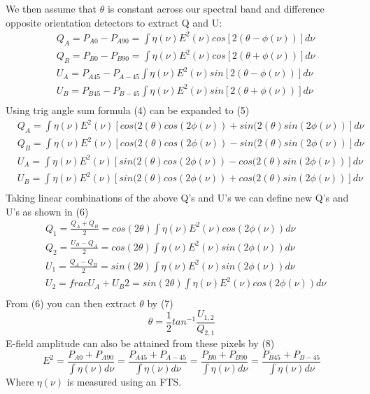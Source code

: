 We then assume that $\theta$ is constant across our spectral band and difference opposite orientation detectors to extract Q and U:
\begin{equation}
\begin{split}
&Q_A= P_{A0}-P_{A90}=\int \eta(\nu)E^2(\nu)cos[2(\theta-\phi(\nu))]d\nu \\
&Q_B = P_{B0}-P_{B90}=\int \eta(\nu)E^2(\nu)cos[2(\theta+\phi(\nu))] d\nu \\
&U_A = P_{A45}-P_{A-45}\int \eta(\nu)E^2(\nu)sin[2(\theta-\phi(\nu))] d\nu \\
&U_B =  P_{B45}-P_{B-45}\int \eta(\nu)E^2(\nu)sin[2(\theta+\phi(\nu))] d\nu \\
\end{split}
\end{equation}
Using trig angle sum formula (4) can be expanded to (5) 
\begin{equation}
\begin{split}
&Q_A= \int \eta(\nu)E^2(\nu)[cos(2(\theta)cos(2\phi(\nu))+sin(2(\theta)sin(2\phi(\nu))]d\nu \\
&Q_B = \int \eta(\nu)E^2(\nu)[cos(2(\theta)cos(2\phi(\nu))-sin(2(\theta)sin(2\phi(\nu))]d\nu \\
&U_A = \int \eta(\nu)E^2(\nu)[sin(2(\theta)cos(2\phi(\nu))-cos(2(\theta)sin(2\phi(\nu))]d\nu \\
&U_B =  \int \eta(\nu)E^2(\nu)[sin(2(\theta)cos(2\phi(\nu))+cos(2(\theta)sin(2\phi(\nu))]d\nu \\
\end{split}
\end{equation}
Taking linear combinations of the above Q's and U's we can define new Q's and U's as shown in (6)
\begin{equation}
\begin{split}
&Q_1=\frac{Q_A+Q_B}{2}= cos(2\theta)\int \eta(\nu)E^2(\nu)cos(2\phi(\nu))d\nu \\
&Q_2 = \frac{U_B-Q_A}{2}= cos(2\theta)\int \eta(\nu)E^2(\nu)sin(2\phi(\nu))d\nu \\
&U_1 = \frac{Q_A-Q_B}{2}= sin(2\theta)\int \eta(\nu)E^2(\nu)sin(2\phi(\nu))d\nu \\
&U_2 =  frac{U_A+U_B}{2}= sin(2\theta)\int \eta(\nu)E^2(\nu)cos(2\phi(\nu))d\nu \\
\end{split}
\end{equation}
From (6) you can then extract $\theta$ by (7)
\begin{equation}
\theta=\frac{1}{2}tan^{-1}\frac{U_{1,2}}{Q_{2,1}}
\end{equation}
E-field amplitude can also be attained from these pixels by (8)
\begin{equation}
E^2=\frac{P_{A0}+P_{A90}}{\int\eta(\nu)d\nu}=\frac{P_{A45}+P_{A-45}}{\int\eta(\nu)d\nu}=\frac{P_{B0}+P_{B90}}{\int\eta(\nu)d\nu}=\frac{P_{B45}+P_{B-45}}{\int\eta(\nu)d\nu}
\end{equation}
Where $\eta(\nu)$ is measured using an FTS.

